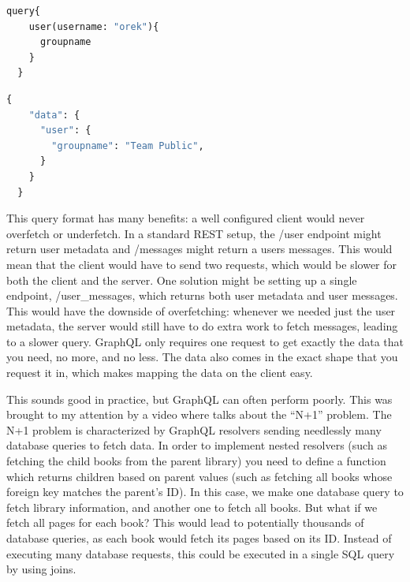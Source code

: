 \documentclass{l4proj}
\begin{document}
\begin{lstlisting}[language=python, caption={An example GraphQL query fetching a user's group}, label=lst:callahan]
  query{
    user(username: "orek"){
      groupname
    }
  }
\end{lstlisting}

\begin{lstlisting}[language=python, caption={Response to above query}]
  {
    "data": {
      "user": {
        "groupname": "Team Public",
      }
    }
  }
\end{lstlisting}
This query format has many benefits: a well configured client would never overfetch or underfetch. In a standard REST setup, the /user endpoint might return user metadata and /messages might return a users messages. This would mean that the client would have to send two requests, which would be slower for both the client and the server. One solution might be setting up a single endpoint, /user\_messages, which returns both user metadata and user messages. This would have the downside of overfetching: whenever we needed just the user metadata, the server would still have to do extra work to fetch messages, leading to a slower query. GraphQL only requires one request to get exactly the data that you need, no more, and no less. The data also comes in the exact shape that you request it in, which makes mapping the data on the client easy. 

This sounds good in practice, but GraphQL can often perform poorly. This was brought to my attention by a video where \citet{Awad} talks about the ``N+1'' problem. The N+1 problem is characterized by GraphQL resolvers sending needlessly many database queries to fetch data. In order to implement nested resolvers (such as fetching the child books from the parent library) you need to define a function which returns children based on parent values (such as fetching all books whose foreign key matches the parent's ID). In this case, we make one database query to fetch library information, and another one to fetch all books. But what if we fetch all pages for each book? This would lead to potentially thousands of database queries, as each book would fetch its pages based on its ID. Instead of executing many database requests, this could be executed in a single SQL query by using joins.
\end{document}
